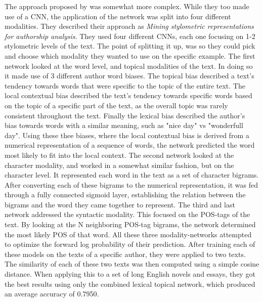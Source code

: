 The approach proposed by \citet{ding2016} was somewhat more complex. While they
too made use of a \gls{CNN}, the application of the network was split into
four different modalities. They described their approach as \textit{Mining
stylometric representations for authorship analysis}. They used four different
\glspl{CNN}, each one focusing on 1-2 stylometric levels of the text. The point
of splitting it up, was so they could pick and choose which modality they wanted
to use on the specific example. The first network looked at the word level,
and topical modalities of the text. In doing so it made use of 3 different
author word biases. The topical bias described a text's tendency towards words
that were specific to the topic of the entire text. The local contextual
bias described the text's tendency towards specific words based on the topic
of a specific part of the text, as the overall topic was rarely consistent
throughout the text. Finally the lexical bias described the author's bias
towards words with a similar meaning, such as "nice day" vs "wonderfull
day". Using these thee biases, where the local contextual bias is derived
from a numerical representation of a sequence of words, the network predicted
the word most likely to fit into the local context. The second network looked
at the character modality, and worked in a somewhat similar fashion, but
on the character level. It represented each word in the text as a set of
character bigrams. After converting each of these bigrams to the numerical
representation, it was fed through a fully connected sigmoid layer, establishing
the relation between the bigrams and the word they came together to represent.
The third and last network addressed the syntactic modality. This focused on
the \gls{POS}-tags of the text. By looking at the N neighboring \gls{POS}-tag
bigrams, the network determined the most likely \gls{POS} of that word. All
these three modality-networks attempted to optimize the forward log probability
of their prediction. After training each of these models on the texts of a
specific author, they were applied to two texts. The similarity of each of these
two texts was then computed using a simple cosine distance. When applying this
to a set of long English novels and essays, they got the best results
using only the combined lexical topical network, which produced an average
accuracy of 0.7950.


